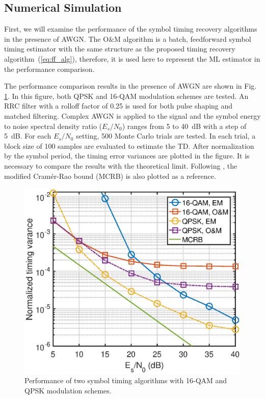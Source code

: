 \documentclass[journal,comsoc]{IEEEtran}
\begin{document}
\subsection{Numerical Simulation}
First, we will examine the performance of the symbol timing recovery algorithms in the presence of AWGN.
The O\&M algorithm is a batch, feedforward symbol timing estimator with the same structure as the proposed timing recovery algorithm~(\ref{eq:ff_alg}), therefore, it is used here to represent the ML estimator in the performance comparison.

The performance comparison results in the presence of AWGN are shown in Fig. \ref{fig:timing_per}.
In this figure, both QPSK and 16-QAM modulation schemes are tested.
An RRC filter with a rolloff factor of 0.25 is used for both pulse shaping and matched filtering.
Complex AWGN is applied to the signal and the symbol energy to noise spectral density ratio (\(E_s/N_0\)) ranges from 5 to 40~dB with a step of 5~dB.
For each \(E_s/N_0\) setting, 500 Monte Carlo trials are tested.
In each trial, a block size of 100 samples are evaluated to estimate the TD.
After normalization by the symbol period, the timing error variances are plotted in the figure.
It is necessary to compare the results with the theoretical limit.
Following \cite{mengali1997synchronization}, the modified Cram\'er-Rao bound (MCRB) is also plotted as a reference.

\begin{figure}[ht]
\centering
\includegraphics[width=3 in]{pic/per_timing.eps}
\caption{Performance of two symbol timing algorithms with 16-QAM and QPSK modulation schemes.}
\label{fig:timing_per} 
\end{figure}   
\end{document}
